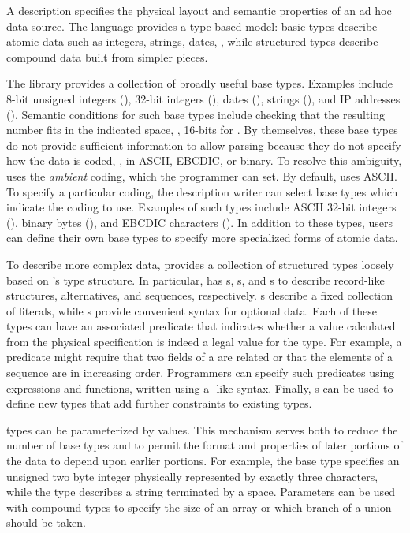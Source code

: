 \documentclass[11pt]{article}
\begin{document}
A \pads{} description specifies the physical layout and 
semantic properties of an ad hoc data source. 
The language provides a type-based model:
basic types describe atomic data such as integers, strings, dates, \etc{}, while
structured types describe compound data built from simpler pieces.
\suppressfloats

The \pads{} library provides a collection of broadly useful base
types.  Examples include 8-bit unsigned integers (), 32-bit
integers (), dates (), strings (),
and IP addresses ().  Semantic conditions for such base types
include checking that the resulting number fits in the indicated
space, \ie, 16-bits for .  By themselves, these base types
do not provide sufficient information to allow parsing because they do
not specify how the data is coded, \ie{}, in ASCII, EBCDIC, or binary.
To resolve this ambiguity, \pads{} uses the \textit{ambient} coding,
which the programmer can set.  By default, \pads{} uses ASCII.  To
specify a particular coding, the description writer can select base
types which indicate the coding to use.  Examples of such types
include ASCII 32-bit integers (), binary bytes
(), and EBCDIC characters ().  In addition to
these types, users can define their own base types to specify more
specialized forms of atomic data.

To describe more complex data, \pads{} provides a collection of
structured types loosely based on \C{}'s type structure.  In
particular, \pads{} has s, s, and s
to describe record-like structures, alternatives, and sequences,
respectively.  s describe a fixed collection of literals,
while s provide convenient syntax for optional data.  Each of
these types can have an associated predicate that indicates whether a
value calculated from the physical specification is indeed a legal
value for the type.  For example, a predicate might require that two
fields of a  are related or that the elements of a
sequence are in increasing order.  Programmers can specify such
predicates using \pads{} expressions and functions, written using a
\C{}-like syntax.  Finally, \pads{} s can be used to
define new types that add further constraints to existing types.

\pads{} types can be parameterized by values.  This mechanism serves
both to reduce the number of base types and to permit the format and
properties of later portions of the data to depend upon earlier
portions.  For example, the base type  specifies
an unsigned two byte integer physically represented by exactly three
characters, while the type  describes a string
terminated by a space.  Parameters can be used with compound types to
specify the size of an array or which branch of a union should be
taken.
\end{document}
